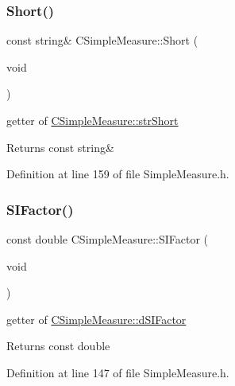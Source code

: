 \subsubsection{\texorpdfstring{Short()}{Short()}}
{\footnotesize\ttfamily const string\& C\+Simple\+Measure\+::\+Short (\begin{DoxyParamCaption}\item[{void}]{ }\end{DoxyParamCaption})\hspace{0.3cm}{\ttfamily [inline]}}



getter of \hyperlink{classCSimpleMeasure_a39260e6516c163955c34dce6795292ad}{C\+Simple\+Measure\+::str\+Short} 

\begin{DoxyReturn}{Returns}
const string\& 
\end{DoxyReturn}


Definition at line 159 of file Simple\+Measure.\+h.

\mbox{\label{classCSimpleMeasure_ad9c08324e46ef4eee5695e7ea1d00018}} 
\subsubsection{\texorpdfstring{S\+I\+Factor()}{SIFactor()}}
{\footnotesize\ttfamily const double C\+Simple\+Measure\+::\+S\+I\+Factor (\begin{DoxyParamCaption}\item[{void}]{ }\end{DoxyParamCaption})\hspace{0.3cm}{\ttfamily [inline]}}



getter of \hyperlink{classCSimpleMeasure_a08be520f9d3a0e50cc63693f2fc607f2}{C\+Simple\+Measure\+::d\+S\+I\+Factor} 

\begin{DoxyReturn}{Returns}
const double 
\end{DoxyReturn}


Definition at line 147 of file Simple\+Measure.\+h.

\mbox{\label{classCSimpleMeasure_a6e04ea2506105c069ae28650c5d69733}} 
